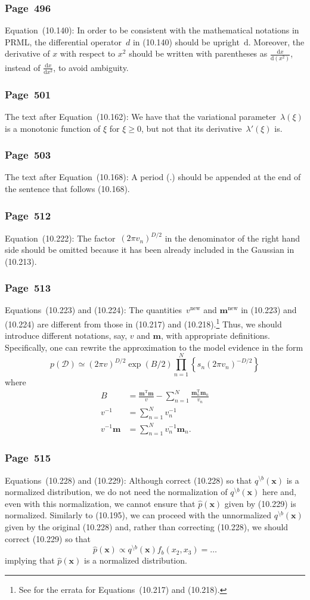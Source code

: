 \documentclass[12pt,a4paper]{article}
\newcommand{\erratum}[1]{\subsubsection*{#1}}
\begin{document}
\erratum{Page~496}
Equation~(10.140):
In order to be consistent with the mathematical notations in PRML,
the differential operator~$d$ in (10.140) should be upright~$\mathrm{d}$.
Moreover, the derivative of $x$ with respect to $x^2$ should be written with parentheses as
$\frac{\mathrm{d}x}{\mathrm{d}\left(x^2\right)}$,
instead of $\frac{\mathrm{d}x}{\mathrm{d}x^2}$, to avoid ambiguity.

\erratum{Page~501}
The text after Equation~(10.162):
We have that
the variational parameter~$\lambda(\xi)$ is a monotonic function of $\xi$ for $\xi \geqslant 0$,
but not that its derivative~$\lambda'(\xi)$ is.

\erratum{Page~503}
The text after Equation~(10.168):
A period (.) should be appended at the end of the sentence that follows (10.168).

\erratum{Page~512}
Equation~(10.222):
The factor~$\left( 2 \pi v_n \right)^{D/2}$ in the denominator of the right hand side should be
omitted because it has been already included in the Gaussian in (10.213).

\erratum{Page~513}
Equations~(10.223) and (10.224):
The quantities~$v^{\text{new}}$ and $\mathbf{m}^{\text{new}}$ in (10.223) and (10.224) are
different from those in (10.217) and (10.218).\footnote{See \citet{Svensen:PRML_errata}
for the errata for Equations~(10.217) and (10.218).}
Thus, we should introduce different notations, say, $v$ and $\mathbf{m}$, with appropriate
definitions.
Specifically, one can rewrite the approximation to the model evidence in the form
\begin{equation}
p(\mathcal{D}) \simeq \left( 2\pi v \right)^{D/2} \exp\left( B/2 \right)
  \prod_{n=1}^{N} \left\{ s_n \left( 2\pi v_n \right)^{-D/2} \right\}
\end{equation}
where
\begin{align}
B &= \frac{\mathbf{m}^{\operatorname{T}}\mathbf{m}}{v}
  - \sum_{n=1}^{N} \frac{\mathbf{m}_n^{\operatorname{T}}\mathbf{m}_n}{v_n} \\
v^{-1} &= \sum_{n=1}^{N} v_n^{-1} \\
v^{-1} \mathbf{m} &= \sum_{n=1}^{N} v_n^{-1} \mathbf{m}_n .
\end{align}

\erratum{Page~515}
Equations~(10.228) and (10.229):
Although \citet{Svensen:PRML_errata} correct (10.228) so that $q^{\setminus b}(\mathbf{x})$ is
a normalized distribution,
we do not need the normalization of $q^{\setminus b}(\mathbf{x})$ here and,
even with this normalization, we cannot ensure that $\hat{p}(\mathbf{x})$ given by (10.229)
is normalized.
Similarly to (10.195), we can proceed with the unnormalized $q^{\setminus b}(\mathbf{x})$ given by
the original (10.228) and, rather than correcting (10.228), we should correct (10.229) so that
\begin{equation}
\hat{p}(\mathbf{x}) \propto q^{\setminus b}(\mathbf{x}) f_b(x_2, x_3) = \dots
\end{equation}
implying that $\hat{p}(\mathbf{x})$ is a normalized distribution.
\end{document}
